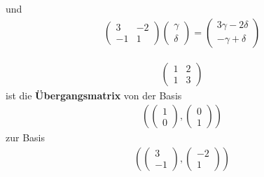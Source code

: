 \documentclass[11pt]{report}
\newcommand*\f[1] {\textbf{#1}}
\begin{document}
und
\begin{align}
\begin{pmatrix} 3 & -2 \\ -1 & 1 \end{pmatrix} \begin{pmatrix} \gamma \\ \delta \end{pmatrix} = \begin{pmatrix} 3 \gamma - 2 \delta \\ -\gamma + \delta \end{pmatrix}
\end{align}

\begin{align}
\begin{pmatrix} 1 & 2 \\ 1 & 3 \end{pmatrix}
\end{align}
ist die \f{Übergangsmatrix} von der Basis
\begin{align}
(\begin{pmatrix} 1 \\ 0 \end{pmatrix}, \begin{pmatrix} 0 \\ 1 \end{pmatrix})
\end{align}
zur Basis
\begin{align}
(\begin{pmatrix} 3 \\ -1 \end{pmatrix}, \begin{pmatrix} -2 \\ 1 \end{pmatrix})
\end{align}
\end{document}
